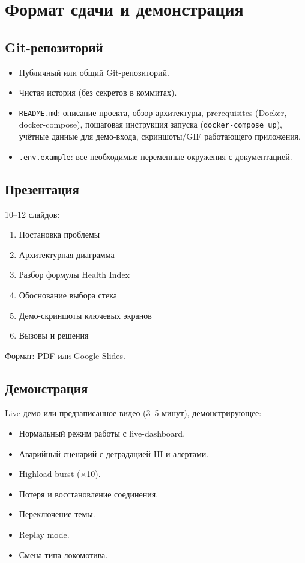 \documentclass[12pt,a4paper]{article}
\newcommand{\code}[1]{\texttt{#1}}
\begin{document}
\section{Формат сдачи и демонстрация}

\subsection{Git-репозиторий}

\begin{itemize}[nosep]
  \item Публичный или общий Git-репозиторий.
  \item Чистая история (без секретов в коммитах).
  \item \code{README.md}: описание проекта, обзор архитектуры, prerequisites (Docker, docker-compose), пошаговая инструкция запуска (\code{docker-compose up}), учётные данные для демо-входа, скриншоты/GIF работающего приложения.
  \item \code{.env.example}: все необходимые переменные окружения с документацией.
\end{itemize}

\subsection{Презентация}

10--12 слайдов:
\begin{enumerate}[nosep]
  \item Постановка проблемы
  \item Архитектурная диаграмма
  \item Разбор формулы Health Index
  \item Обоснование выбора стека
  \item Демо-скриншоты ключевых экранов
  \item Вызовы и решения
\end{enumerate}

Формат: PDF или Google Slides.

\subsection{Демонстрация}

Live-демо или предзаписанное видео (3--5 минут), демонстрирующее:

\begin{itemize}[nosep]
  \item Нормальный режим работы с live-dashboard.
  \item Аварийный сценарий с деградацией HI и алертами.
  \item Highload burst ($\times$10).
  \item Потеря и восстановление соединения.
  \item Переключение темы.
  \item Replay mode.
  \item Смена типа локомотива.
\end{itemize}
\end{document}

